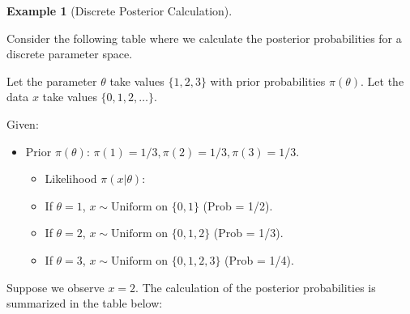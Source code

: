 \documentclass[
  letterpaper,
  DIV=11,
  numbers=noendperiod]{scrreprt}
\providecommand{\tightlist}{%
  \setlength{\itemsep}{0pt}\setlength{\parskip}{0pt}}
\renewcommand{\[}{\begin{equation}}
\renewcommand{\]}{\end{equation}}
\theoremstyle{definition}
\theoremstyle{plain}
\theoremstyle{plain}
\theoremstyle{plain}
\theoremstyle{definition}
\newtheorem{example}{Example}[chapter]
\theoremstyle{plain}
\theoremstyle{remark}
\begin{document}
\begin{example}[Discrete Posterior
Calculation]\protect\hypertarget{exm-discrete-posterior}{}\label{exm-discrete-posterior}

Consider the following table where we calculate the posterior
probabilities for a discrete parameter space.

Let the parameter \(\theta\) take values \(\{1, 2, 3\}\) with prior
probabilities \(\pi(\theta)\). Let the data \(x\) take values
\(\{0, 1, 2, \dots\}\).

Given:

\begin{itemize}
\tightlist
\item
  Prior \(\pi(\theta)\): \(\pi(1)=1/3, \pi(2)=1/3, \pi(3)=1/3\).

  \begin{itemize}
  \tightlist
  \item
    Likelihood \(\pi(x|\theta)\):
  \item
    If \(\theta=1\), \(x \sim \text{Uniform on } \{0, 1\}\) (Prob =
    1/2).
  \item
    If \(\theta=2\), \(x \sim \text{Uniform on } \{0, 1, 2\}\) (Prob =
    1/3).
  \item
    If \(\theta=3\), \(x \sim \text{Uniform on } \{0, 1, 2, 3\}\) (Prob
    = 1/4).
  \end{itemize}
\end{itemize}

Suppose we observe \(x=2\). The calculation of the posterior
probabilities is summarized in the table below:


\end{example}
\end{document}
